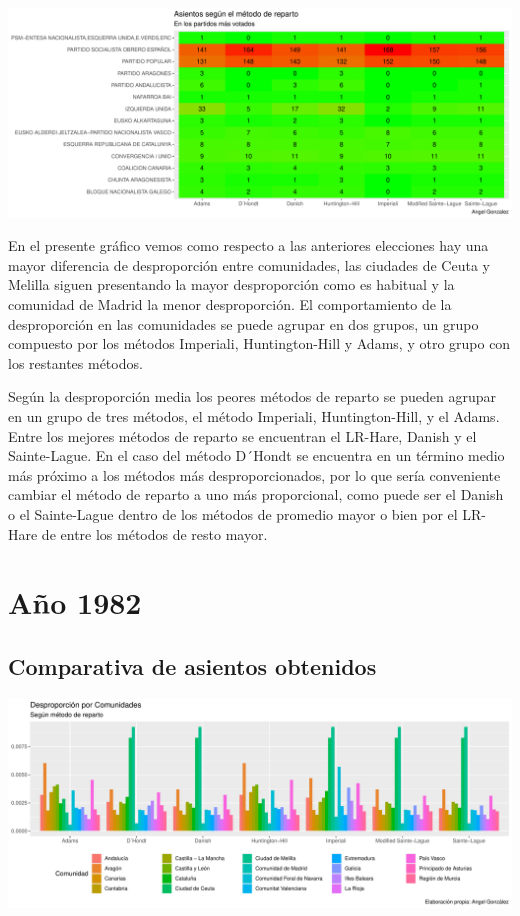 \documentclass[12pt,a4paper,]{book}
\numberwithin{dummy}{section}
\theoremstyle{ocrenumbox}
\theoremstyle{blacknumex}
\theoremstyle{blacknumbox}
\theoremstyle{ocrenum}
\theoremstyle{ocrenum}
\begin{document}
\begin{center}\includegraphics[width=1\linewidth]{figurasR/unnamed-chunk-82-2} \end{center}

En el presente gráfico vemos como respecto a las anteriores elecciones
hay una mayor diferencia de desproporción entre comunidades, las
ciudades de Ceuta y Melilla siguen presentando la mayor desproporción
como es habitual y la comunidad de Madrid la menor desproporción. El
comportamiento de la desproporción en las comunidades se puede agrupar
en dos grupos, un grupo compuesto por los métodos Imperiali,
Huntington-Hill y Adams, y otro grupo con los restantes métodos.

Según la desproporción media los peores métodos de reparto se pueden
agrupar en un grupo de tres métodos, el método Imperiali,
Huntington-Hill, y el Adams. Entre los mejores métodos de reparto se
encuentran el LR-Hare, Danish y el Sainte-Lague. En el caso del método
D´Hondt se encuentra en un término medio más próximo a los métodos más
desproporcionados, por lo que sería conveniente cambiar el método de
reparto a uno más proporcional, como puede ser el Danish o el
Sainte-Lague dentro de los métodos de promedio mayor o bien por el
LR-Hare de entre los métodos de resto mayor.

\hypertarget{auxf1o-1982}{%
\section{Año 1982}\label{auxf1o-1982}}

\hypertarget{comparativa-de-asientos-obtenidos-2}{%
\subsection{Comparativa de asientos
obtenidos}\label{comparativa-de-asientos-obtenidos-2}}

\begin{center}\includegraphics[width=1\linewidth]{figurasR/unnamed-chunk-84-1} \end{center}
\end{document}
